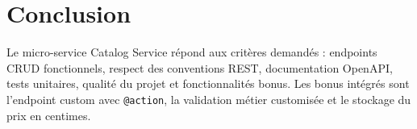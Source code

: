 \documentclass[12pt,a4paper]{article}
\begin{document}
\section{Conclusion}

Le micro-service Catalog Service répond aux critères demandés : endpoints CRUD fonctionnels, respect des conventions REST, documentation OpenAPI, tests unitaires, qualité du projet et fonctionnalités bonus. Les bonus intégrés sont l'endpoint custom avec \texttt{@action}, la validation métier customisée et le stockage du prix en centimes.
\end{document}

